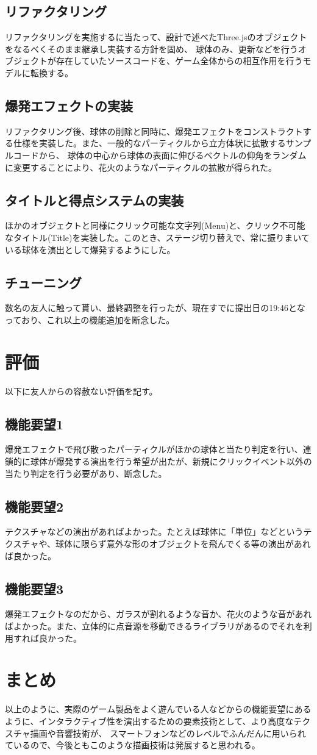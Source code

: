 \documentclass[10pt,a4j]{jreport}
\begin{document}
\subsection{リファクタリング}
リファクタリングを実施するに当たって、設計で述べたThree.jsのオブジェクトをなるべくそのまま継承し実装する方針を固め、
球体のみ、更新などを行うオブジェクトが存在していたソースコードを、ゲーム全体からの相互作用を行うモデルに転換する。
\subsection{爆発エフェクトの実装}
リファクタリング後、球体の削除と同時に、爆発エフェクトをコンストラクトする仕様を実装した。また、一般的なパーティクルから立方体状に拡散するサンプルコードから、
球体の中心から球体の表面に伸びるベクトルの仰角をランダムに変更することにより、花火のようなパーティクルの拡散が得られた。
\subsection{タイトルと得点システムの実装}
ほかのオブジェクトと同様にクリック可能な文字列(Menu)と、クリック不可能なタイトル(Title)を実装した。このとき、ステージ切り替えで、常に振りまいている球体を演出として爆発するようにした。
\subsection{チューニング}
数名の友人に触って貰い、最終調整を行ったが、現在すでに提出日の19:46となっており、これ以上の機能追加を断念した。
\section{評価}
以下に友人からの容赦ない評価を記す。
\subsection{機能要望1}
爆発エフェクトで飛び散ったパーティクルがほかの球体と当たり判定を行い、連鎖的に球体が爆発する演出を行う希望が出たが、新規にクリックイベント以外の当たり判定を行う必要があり、断念した。
\subsection{機能要望2}
テクスチャなどの演出があればよかった。たとえば球体に「単位」などというテクスチャや、球体に限らず意外な形のオブジェクトを飛んでくる等の演出があれば良かった。
\subsection{機能要望3}
爆発エフェクトなのだから、ガラスが割れるような音か、花火のような音があればよかった。また、立体的に点音源を移動できるライブラリがあるのでそれを利用すれば良かった。
\section{まとめ}
以上のように、実際のゲーム製品をよく遊んでいる人などからの機能要望にあるように、インタラクティブ性を演出するための要素技術として、より高度なテクスチャ描画や音響技術が、
スマートフォンなどのレベルでふんだんに用いられているので、今後ともこのような描画技術は発展すると思われる。
\end{document}
